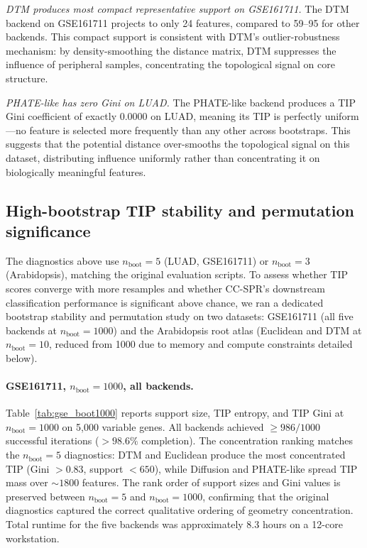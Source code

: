 \documentclass[11pt]{article}
\begin{document}
\textit{DTM produces most compact representative support on GSE161711.}
The DTM backend on GSE161711 projects to only 24 features, compared to 59--95 for other backends.
This compact support is consistent with DTM's outlier-robustness mechanism: by density-smoothing the distance matrix, DTM suppresses the influence of peripheral samples, concentrating the topological signal on core structure.

\textit{PHATE-like has zero Gini on LUAD.}
The PHATE-like backend produces a TIP Gini coefficient of exactly $0.0000$ on LUAD, meaning its TIP is perfectly uniform---no feature is selected more frequently than any other across bootstraps.
This suggests that the potential distance over-smooths the topological signal on this dataset, distributing influence uniformly rather than concentrating it on biologically meaningful features.

\subsection{High-bootstrap TIP stability and permutation significance}
\label{sec:highboot}

The diagnostics above use $n_{\text{boot}} = 5$ (LUAD, GSE161711) or $n_{\text{boot}} = 3$ (Arabidopsis), matching the original evaluation scripts.
To assess whether TIP scores converge with more resamples and whether CC-SPR's downstream classification performance is significant above chance, we ran a dedicated bootstrap stability and permutation study on two datasets: GSE161711 (all five backends at $n_{\text{boot}} = 1000$) and the Arabidopsis root atlas (Euclidean and DTM at $n_{\text{boot}} = 10$, reduced from 1000 due to memory and compute constraints detailed below).

\paragraph{GSE161711, $n_{\text{boot}} = 1000$, all backends.}
Table~\ref{tab:gse_boot1000} reports support size, TIP entropy, and TIP Gini at $n_{\text{boot}} = 1000$ on 5{,}000 variable genes.
All backends achieved $\geq 986/1000$ successful iterations ($> 98.6\%$ completion).
The concentration ranking matches the $n_{\text{boot}} = 5$ diagnostics: DTM and Euclidean produce the most concentrated TIP (Gini $> 0.83$, support $< 650$), while Diffusion and PHATE-like spread TIP mass over $\sim 1800$ features.
The rank order of support sizes and Gini values is preserved between $n_{\text{boot}} = 5$ and $n_{\text{boot}} = 1000$, confirming that the original diagnostics captured the correct qualitative ordering of geometry concentration.
Total runtime for the five backends was approximately 8.3 hours on a 12-core workstation.
\end{document}
